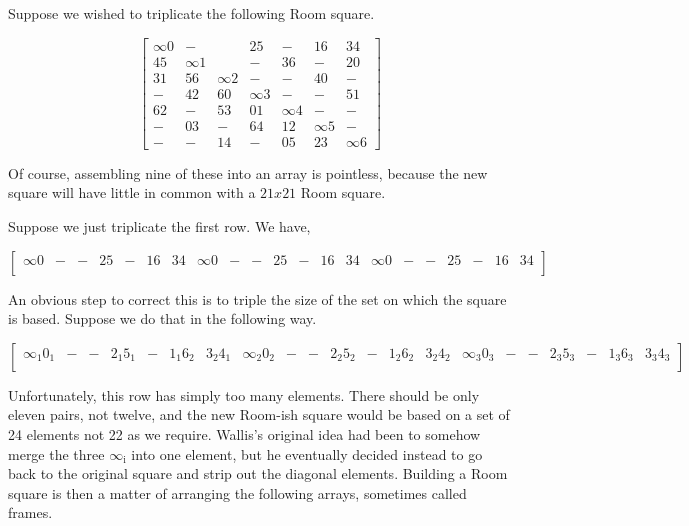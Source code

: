 \begin{example}
Suppose we wished to triplicate the following Room square.

\begin{equation}
  \begin{bmatrix}
    \infty 0 &   - &     &  25 &   - &  16 &  34 \\
    45 &  \infty 1 &     &   - &  36 &   - &  20 \\
    31 &  56 &  \infty 2 &   - &   - &  40 &   - \\
     - &  42 &  60 &  \infty 3 &   - &   - &  51 \\
    62 &   - &  53 &  01 &  \infty 4 &   - &   - \\
     - &  03 &   - &  64 &  12 &  \infty 5 &   - \\
     - &   - &  14 &   - &  05 &  23 &  \infty 6 
  \end{bmatrix}
  \label{eq:triple-room}
\end{equation}

Of course, assembling nine of these into an array is pointless, because the new square will have little in common with a $21 x 21$ Room square.

Suppose we just triplicate the first row.
We have,

\begin{equation*}
  \begin{bmatrix}
    \infty 0 & - & - & 25 & - & 16 & 34 & \infty 0 & - & - & 25 & - & 16 & 34 & \infty 0 & - & - & 25 & - & 16 & 34 \\
  \end{bmatrix}
\end{equation*}

An obvious step to correct this is to triple the size of the set on which the square is based.
Suppose we do that in the following way.

\begin{equation*}
  \begin{bmatrix}
    \infty_{1} 0_{1} & - & - & 2_{1}5_{1} & - & 1_{1}6_{2} & 3_{2}4_{1} & \infty_{2} 0_{2} & - & - & 2_{2}5_{2} & - & 1_{2}6_{2} & 3_{2}4_{2} & \infty_{3} 0_{3} & - & - & 2_{3}5_{3} & - & 1_{3}6_{3} & 3_{3}4_{3} \\
  \end{bmatrix}
\end{equation*}

Unfortunately, this row has simply too many elements.
There should be only eleven pairs, not twelve, and the new Room-ish square would be based on a set of 24 elements not 22 as we require.
Wallis’s original idea had been to somehow merge the three $\infty _\mathrm{i}$ into one element, but he eventually decided instead to go back to the original square and strip out the diagonal elements.
Building a Room square is then a matter of arranging the following arrays, sometimes called frames.


\end{example}
